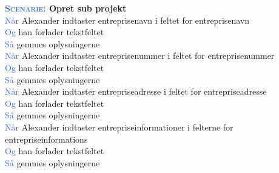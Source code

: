 \textbf{\textsc{\textcolor{RoyalBlue}{Scenarie:}} Opret sub projekt}\\
\textcolor{RoyalBlue}{Når} Alexander indtaster entreprisenavn i feltet for entreprisenavn\\
\textcolor{RoyalBlue}{Og} han forlader tekstfeltet\\
\textcolor{RoyalBlue}{Så} gemmes oplysningerne\\
\textcolor{RoyalBlue}{Når} Alexander indtaster entreprisenummer i feltet for entreprisenummer\\
\textcolor{RoyalBlue}{Og} han forlader tekstfeltet\\
\textcolor{RoyalBlue}{Så} gemmes oplysningerne\\
\textcolor{RoyalBlue}{Når} Alexander indtaster entrepriseadresse i feltet for entrepriseadresse\\
\textcolor{RoyalBlue}{Og} han forlader tekstfeltet\\
\textcolor{RoyalBlue}{Så} gemmes oplysningerne\\
\textcolor{RoyalBlue}{Når} Alexander indtaster entrepriseinformationer i felterne for entrepriseinformations\\
\textcolor{RoyalBlue}{Og} han forlader tekstfeltet\\
\textcolor{RoyalBlue}{Så} gemmes oplysningerne\\
